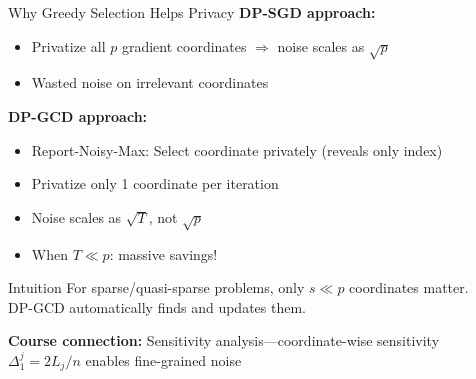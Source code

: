 \documentclass[10pt]{beamer}
\begin{document}
\begin{frame}{Why Greedy Selection Helps Privacy}
\textbf{DP-SGD approach:}
\begin{itemize}
\item Privatize all $p$ gradient coordinates $\Rightarrow$ noise scales as $\sqrt{p}$
\item Wasted noise on irrelevant coordinates
\end{itemize}

\vspace{1em}
\textbf{DP-GCD approach:}
\begin{itemize}
\item \alert{Report-Noisy-Max}: Select coordinate privately (reveals only index)
\item Privatize only \alert{1 coordinate} per iteration
\item Noise scales as $\sqrt{T}$, not $\sqrt{p}$
\item When $T \ll p$: massive savings!
\end{itemize}

\vspace{1em}
\begin{block}{Intuition}
For sparse/quasi-sparse problems, only $s \ll p$ coordinates matter.\\
DP-GCD automatically finds and updates them.
\end{block}

\vspace{0.3em}
\textbf{Course connection:} Sensitivity analysis---coordinate-wise sensitivity $\Delta_1^j = 2L_j/n$ enables fine-grained noise
\end{frame}
\end{document}
